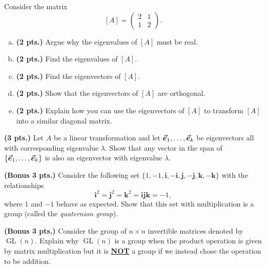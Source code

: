 \documentclass[12pt]{amsbook}
\newcommand{\quati}{\mathbf{i}}
\newcommand{\quatj}{\mathbf{j}}
\newcommand{\quatk}{\mathbf{k}}
\begin{document}
\begin{problem}
Consider the matrix
\[
[A] = \begin{pmatrix} 2 & 1 \\ 1 & 2 \end{pmatrix}.
\]
\begin{enumerate}[(a)]
    \item \textbf{(2 pts.)} Argue why the eigenvalues of $[A]$ must be real.
    \item \textbf{(2 pts.)} Find the eigenvalues of $[A]$.
    \item \textbf{(2 pts.)} Find the eigenvectors of $[A]$.
    \item \textbf{(2 pts.)} Show that the eigenvectors of $[A]$ are orthogonal.
    \item \textbf{(2 pts.)} Explain how you can use the eigenvectors of $[A]$ to transform $[A]$ into a similar diagonal matrix.
\end{enumerate}
\end{problem}


\begin{problem}
\textbf{(3 pts.)} Let $A$ be a linear transformation and let $\boldsymbol{\vec{e}}_1,\dots,\boldsymbol{\vec{e}}_k$ be eigenvectors all with corresponding eigenvalue $\lambda$.  Show that any vector in the span of $\{\boldsymbol{\vec{e}}_1,\dots,\boldsymbol{\vec{e}}_k\}$ is also an eigenvector with eigenvalue $\lambda$.
\end{problem}


\begin{problem}
    \textbf{(Bonus 3 pts.)} Consider the following set $\{1,-1,\quati,-\quati,\quatj,-\quatj,\quatk,-\quatk\}$ with the relationships
    \[
    \quati^2=\quatj^2=\quatk^2=\quati \quatj \quatk=-1,
    \]
    where $1$ and $-1$ behave as expected. Show that this set with multiplication is a group (called the \emph{quaternion group}).
\end{problem}

\begin{problem}
    \textbf{(Bonus 3 pts.)} Consider the group of $n\times n$ invertible matrices denoted by $\operatorname{GL}(n)$. Explain why $\operatorname{GL}(n)$ is a group when the product operation is given by matrix multiplication but it is \textbf{\underline{NOT}} a group if we instead chose the operation to be addition.
\end{problem}
\end{document}
